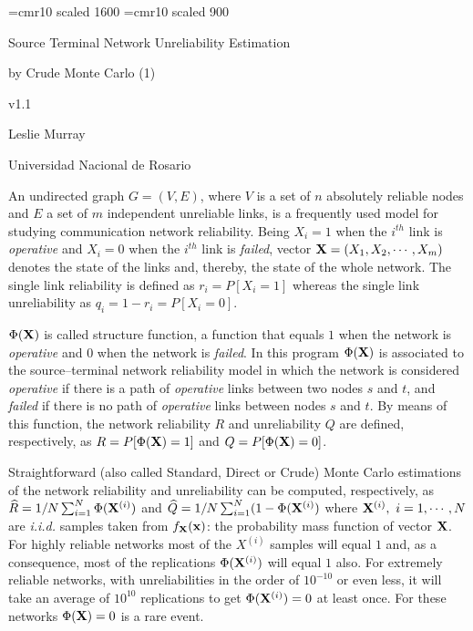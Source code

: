 






\font\sixteenrm =cmr10  scaled 1600  %
\font\ninerm    =cmr10  scaled  900  %

\datethis
\null
\bigskip
\centerline{\sixteenrm Source Terminal Network Unreliability Estimation}
\smallskip
\centerline{\sixteenrm by Crude Monte Carlo (1)}
\smallskip
\centerline{v1.1}
\smallskip
\centerline{\ninerm Leslie Murray}
\vskip 0pt
\centerline{\ninerm Universidad Nacional de Rosario}
\bigskip

An undirected graph $G=(V,E)$, where $V$ is a set of $n$ absolutely reliable
nodes and $E$ a set of $m$ independent unreliable links, is a frequently used
model for studying communication network reliability. Being $X_i=1$ when the
$i^{th}$ link is {\it operative} and $X_i=0$ when the $i^{th}$ link is
{\it failed}, vector ${\bf X}=(X_1,X_2,\cdots,X_m)$ denotes the state of the
links and, thereby, the state of the whole network. The single link reliability
is defined as $r_i=P[X_i=1]$ whereas the single link unreliability as
$q_i=1-r_i=P[X_i=0]$.

$\Phi({\bf X})$ is called structure function, a function that equals $1$ when
the network is {\it operative} and $0$ when the network is {\it failed}. In
this program $\Phi({\bf X})$ is associated to the source--terminal network
reliability model in which the network is considered {\it operative} if there
is a path of {\it operative} links between two nodes $s$ and $t$, and
{\it failed} if there is no path of {\it operative} links between nodes $s$ and
$t$. By means of this function, the network reliability $R$ and unreliability
$Q$ are defined, respectively, as $R=P[\Phi({\bf X})=1]$ and
$Q=P[\Phi({\bf X})=0]$.

Straightforward (also called Standard, Direct or Crude) Monte Carlo estimations
of the network reliability and unreliability can be computed, respectively, as
$\widehat{R} = 1/N \sum_{i=1}^{N} \Phi({\bf X}^{(i)})$ and $\widehat{Q} = 1/N
\sum_{i=1}^{N}(1-\Phi({\bf X}^{(i)})$ where ${\bf X}^{(i)},\ i=1,\cdots,N$ are
{\it i.i.d.} samples taken from $f_{{\bf X}}({\bf x})$: the probability mass
function of vector ${\bf X}$. For highly reliable networks most of the
$X^{(i)}$
samples will equal $1$ and, as a consequence, most of the replications
$\Phi({\bf X}^{(i)})$ will equal $1$ also. For extremely reliable networks,
with
unreliabilities in the order of $10^{-10}$ or even less, it will take an
average
of $10^{10}$ replications to get $\Phi({\bf X}^{(i)})=0$ at least once. For
these networks $\Phi({\bf X})=0$ is a rare event.


